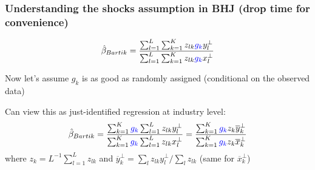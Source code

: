 \documentclass[notes,11pt, aspectratio=169]{beamer}
\newenvironment{wideitemize}{\itemize\addtolength{\itemsep}{10pt}}{\enditemize}
\begin{document}
  \begin{frame}
    \frametitle{Understanding the shocks assumption in BHJ (drop time for convenience)}
    
$$\hat{\beta}_{Bartik}=  \frac{  \sum_{l=1}^L  \sum_{k=1}^K  z_{lk} \textcolor{blue}{g_{k}} y_{l}^\perp    }{   \sum_{l=1}^L \sum_{k=1}^K  z_{lk} \textcolor{blue}{g_{k}} x_{l}^\perp   }  $$

    \begin{wideitemize}
      \item Now let's assume $g_{k}$ is as good as randomly assigned (conditional on the observed data)
      \item Can view this as just-identified regression at industry level:
    \end{wideitemize}
    $$\hat{\beta}_{Bartik}=  \frac{ \sum_{k=1}^K\textcolor{blue}{g_{k}}\sum_{l=1}^L   z_{lk}  y_{l}^\perp    }{   \sum_{k=1}^K  \textcolor{blue}{g_{k}}  \sum_{l=1}^L z_{lk}x_{l}^\perp   }   =  \frac{ \sum_{k=1}^K\textcolor{blue}{g_{k}} z_{k} \overline{y}_{k}^\perp    }{   \sum_{k=1}^K  \textcolor{blue}{g_{k}} z_{k} \overline{x}_{k}^\perp   } $$
    where $z_{k} = L^{-1}\sum_{l = 1}^{L}z_{lk}$ and $\overline{y}_{k}^{\perp} = \sum_{l}z_{lk}y_{l}^{\perp} / \sum_{l}z_{lk}$ (same for $\overline{x}^{\perp}_{k}$)
  \end{frame}
\end{document}
